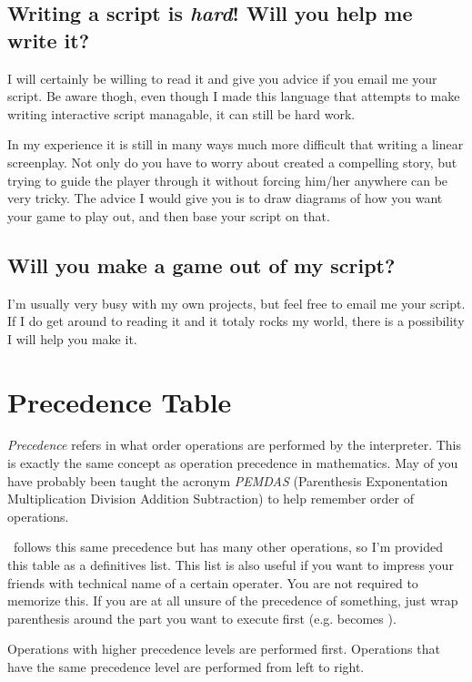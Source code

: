 \documentclass{book}
\begin{document}
\section{Writing a script is \emph{hard}!  Will you help me write it?}
I will certainly be willing to read it and give you advice if you email me your script.  Be aware thogh, even though I made this language that attempts to make writing interactive script managable, it can still be hard work.  

In my experience it is still in many ways much more difficult that writing a linear screenplay.  Not only do you have to worry about created a compelling story, but trying to guide the player through it without forcing him/her anywhere can be very tricky.  The advice I would give you is to draw diagrams of how you want your game to play out, and then base your script on that.  


\section{Will you make a game out of my script?}
I'm usually very busy with my own projects, but feel free to email me your script.  If I do get around to reading it and it totaly rocks my world, there is a possibility I will help you make it.  

%
%

\chapter{Precedence Table}
\emph{Precedence} refers in what order operations are performed by the interpreter.  This is exactly the same concept as operation precedence in mathematics.  May of you have probably been taught the acronym \emph{PEMDAS} (Parenthesis Exponentation Multiplication Division Addition Subtraction) to help remember order of operations.  

\SSquared\ follows this same precedence but has many other operations, so I'm provided this table as a definitives list.  This list is also useful if you want to impress your friends with technical name of a certain operater.  You are not required to memorize this.  If you are at all unsure of the precedence of something, just wrap parenthesis around the part you want to execute first (e.g.  becomes ).

Operations with higher precedence levels are performed first.  Operations that have the same precedence level are performed from left to right.
\end{document}
